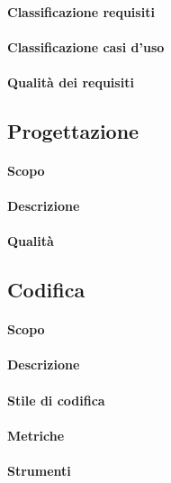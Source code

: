 \paragraph{Classificazione requisiti}
\paragraph{Classificazione casi d'uso}
\paragraph{Qualità dei requisiti}
\subsection{Progettazione}
\paragraph{Scopo}
\paragraph{Descrizione}
\paragraph{Qualità}
\subsection{Codifica}
\paragraph{Scopo}
\paragraph{Descrizione}
\paragraph{Stile di codifica}
\paragraph{Metriche}
\paragraph{Strumenti}
